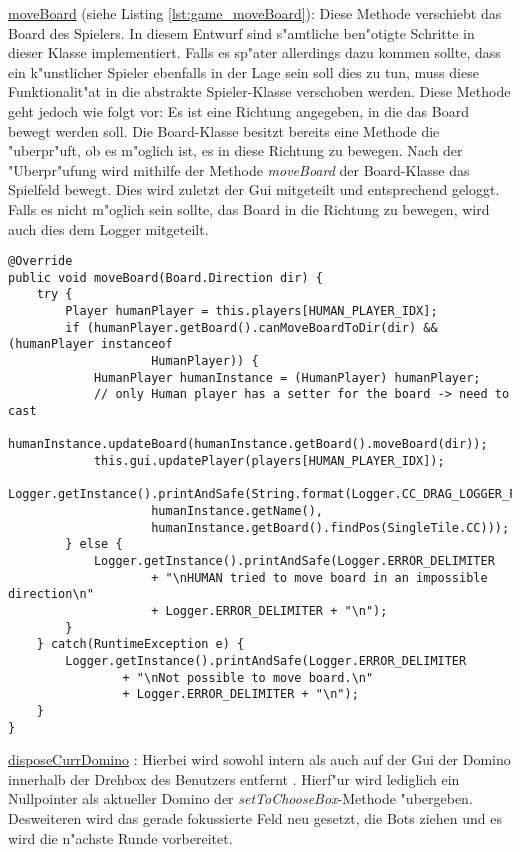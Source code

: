 \underline{moveBoard} (siehe Listing \ref{lst:game_moveBoard}): Diese Methode verschiebt das Board des Spielers. In diesem Entwurf sind s"amtliche ben"otigte Schritte in dieser Klasse implementiert. Falls es sp"ater allerdings dazu kommen sollte, dass ein k"unstlicher Spieler ebenfalls in der Lage sein soll dies zu tun, muss diese Funktionalit"at in die abstrakte Spieler-Klasse verschoben werden. Diese Methode geht jedoch wie folgt vor: Es ist eine Richtung angegeben, in die das Board bewegt werden soll. Die Board-Klasse besitzt bereits eine Methode die "uberpr"uft, ob es m"oglich ist, es in diese Richtung zu bewegen. Nach der "Uberpr"ufung wird mithilfe der Methode \emph{moveBoard} der Board-Klasse das Spielfeld bewegt. Dies wird zuletzt der Gui mitgeteilt und entsprechend geloggt. Falls es nicht m"oglich sein sollte, das Board in die Richtung zu bewegen, wird auch dies dem Logger mitgeteilt. 

\begin{lstlisting}[float,style=CodeHighlighting,caption=Game - moveBoard,label=lst:game_moveBoard]
@Override
public void moveBoard(Board.Direction dir) {
    try {
        Player humanPlayer = this.players[HUMAN_PLAYER_IDX];
        if (humanPlayer.getBoard().canMoveBoardToDir(dir) && (humanPlayer instanceof 
        			HumanPlayer)) {
            HumanPlayer humanInstance = (HumanPlayer) humanPlayer; 
            // only Human player has a setter for the board -> need to cast
            humanInstance.updateBoard(humanInstance.getBoard().moveBoard(dir));
            this.gui.updatePlayer(players[HUMAN_PLAYER_IDX]);
            Logger.getInstance().printAndSafe(String.format(Logger.CC_DRAG_LOGGER_FORMAT,
                    humanInstance.getName(), 
                    humanInstance.getBoard().findPos(SingleTile.CC)));
        } else {
            Logger.getInstance().printAndSafe(Logger.ERROR_DELIMITER
                    + "\nHUMAN tried to move board in an impossible direction\n" 
                    + Logger.ERROR_DELIMITER + "\n");
        }
    } catch(RuntimeException e) {
        Logger.getInstance().printAndSafe(Logger.ERROR_DELIMITER 
        		+ "\nNot possible to move board.\n"
                + Logger.ERROR_DELIMITER + "\n");
    }
}
\end{lstlisting}

\underline{disposeCurrDomino} : Hierbei wird sowohl intern als auch auf der Gui der Domino innerhalb der Drehbox des Benutzers entfernt . Hierf"ur wird lediglich ein Nullpointer als aktueller Domino der \emph{setToChooseBox}-Methode "ubergeben. Desweiteren wird das gerade fokussierte Feld neu gesetzt, die Bots ziehen und es wird die n"achste Runde vorbereitet. 

